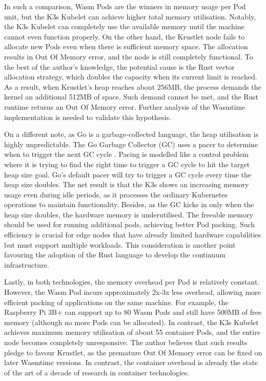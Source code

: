 In such a comparison, Wasm Pods are the winners in memory usage per Pod unit, but the K3s Kubelet can achieve higher total memory utilisation. Notably, the K3s Kubelet can completely use the available memory until the machine cannot even function properly. On the other hand, the Krustlet node fails to allocate new Pods even when there is sufficient memory space. The allocation results in Out Of Memory error, and the node is still completely functional. To the best of the author's knowledge, the potential cause is the Rust vector allocation strategy, which doubles the capacity when its current limit is reached. As a result, when Krustlet's heap reaches about 256MB, the process demands the kernel an additional 512MB of space. Such demand cannot be met, and the Rust runtime returns an Out Of Memory error. Further analysis of the Wasmtime implementation is needed to validate this hypothesis. 

On a different note, as Go is a garbage-collected language, the heap utilisation is highly unpredictable. The Go Garbage Collector (GC) uses a pacer to determine when to trigger the next GC cycle \cite{go-gc}. Pacing is modelled like a control problem where it is trying to find the right time to trigger a GC cycle to hit the target heap size goal. Go’s default pacer will try to trigger a GC cycle every time the heap size doubles. The net result is that the K3s shows an increasing memory usage even during idle periods, as it processes the ordinary Kubernetes operations to maintain functionality. Besides, as the GC kicks in only when the heap size doubles, the hardware memory is underutilised. The freeable memory should be used for running additional pods, achieving better Pod packing. Such efficiency is crucial for edge nodes that have already limited hardware capabilities but must support multiple workloads. This consideration is another point favouring the adoption of the Rust language to develop the continuum infrastructure.

Lastly, in both technologies, the memory overhead per Pod is relatively constant. However, the Wasm Pod incurs approximately 2x-3x less overhead, allowing more efficient packing of applications on the same machine. For example, the Raspberry Pi 3B+ can support up to 80 Wasm Pods and still have 500MB of free memory (although no more Pods can be allocated). In contrast, the K3s Kubelet achieves maximum memory utilisation of about 55 container Pods, and the entire node becomes completely unresponsive. The author believes that such results pledge to favour Krustlet, as the premature Out Of Memory error can be fixed on later Wasmtime versions. In contrast, the container overhead is already the state of the art of a decade of research in container technologies.

